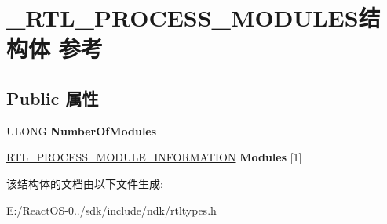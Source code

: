 \hypertarget{struct___r_t_l___p_r_o_c_e_s_s___m_o_d_u_l_e_s}{}\section{\+\_\+\+R\+T\+L\+\_\+\+P\+R\+O\+C\+E\+S\+S\+\_\+\+M\+O\+D\+U\+L\+E\+S结构体 参考}
\label{struct___r_t_l___p_r_o_c_e_s_s___m_o_d_u_l_e_s}
\subsection*{Public 属性}
\begin{DoxyCompactItemize}
\item 
\mbox{\label{struct___r_t_l___p_r_o_c_e_s_s___m_o_d_u_l_e_s_ab22b0e69c4970861ee208383c7fc7b86}} 
U\+L\+O\+NG {\bfseries Number\+Of\+Modules}
\item 
\mbox{\label{struct___r_t_l___p_r_o_c_e_s_s___m_o_d_u_l_e_s_a6de3a347bb8cae48e56e331c235ec9dd}} 
\hyperlink{struct___r_t_l___p_r_o_c_e_s_s___m_o_d_u_l_e___i_n_f_o_r_m_a_t_i_o_n}{R\+T\+L\+\_\+\+P\+R\+O\+C\+E\+S\+S\+\_\+\+M\+O\+D\+U\+L\+E\+\_\+\+I\+N\+F\+O\+R\+M\+A\+T\+I\+ON} {\bfseries Modules} \mbox{[}1\mbox{]}
\end{DoxyCompactItemize}


该结构体的文档由以下文件生成\+:\begin{DoxyCompactItemize}
\item 
E\+:/\+React\+O\+S-\/0../sdk/include/ndk/rtltypes.\+h\end{DoxyCompactItemize}
